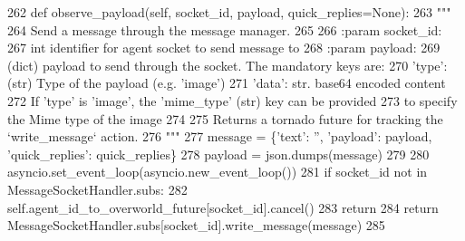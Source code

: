 \begin{DoxyCode}
262     \textcolor{keyword}{def }observe\_payload(self, socket\_id, payload, quick\_replies=None):
263         \textcolor{stringliteral}{"""}
264 \textcolor{stringliteral}{        Send a message through the message manager.}
265 \textcolor{stringliteral}{}
266 \textcolor{stringliteral}{        :param socket\_id:}
267 \textcolor{stringliteral}{            int identifier for agent socket to send message to}
268 \textcolor{stringliteral}{        :param payload:}
269 \textcolor{stringliteral}{            (dict) payload to send through the socket. The mandatory keys are:}
270 \textcolor{stringliteral}{                    'type': (str) Type of the payload (e.g. 'image')}
271 \textcolor{stringliteral}{                    'data': str. base64 encoded content}
272 \textcolor{stringliteral}{                    If 'type' is 'image', the 'mime\_type' (str) key can be provided}
273 \textcolor{stringliteral}{                    to specify the Mime type of the image}
274 \textcolor{stringliteral}{}
275 \textcolor{stringliteral}{        Returns a tornado future for tracking the `write\_message` action.}
276 \textcolor{stringliteral}{        """}
277         message = \{\textcolor{stringliteral}{'text'}: \textcolor{stringliteral}{''}, \textcolor{stringliteral}{'payload'}: payload, \textcolor{stringliteral}{'quick\_replies'}: quick\_replies\}
278         payload = json.dumps(message)
279 
280         asyncio.set\_event\_loop(asyncio.new\_event\_loop())
281         \textcolor{keywordflow}{if} socket\_id \textcolor{keywordflow}{not} \textcolor{keywordflow}{in} MessageSocketHandler.subs:
282             self.agent\_id\_to\_overworld\_future[socket\_id].cancel()
283             \textcolor{keywordflow}{return}
284         \textcolor{keywordflow}{return} MessageSocketHandler.subs[socket\_id].write\_message(message)
285 
\end{DoxyCode}
\mbox{\label{classparlai_1_1chat__service_1_1services_1_1websocket_1_1websocket__manager_1_1WebsocketManager_ab5ae0fc35ee7b4c2015954814b8b60de}} 
